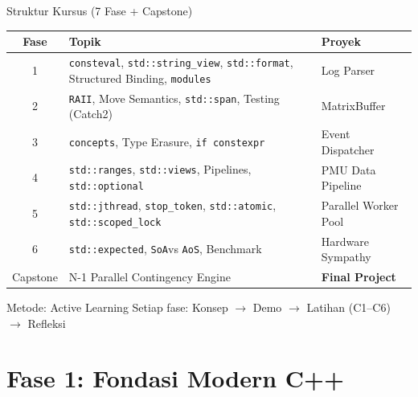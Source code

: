 \documentclass[aspectratio=169,10pt]{beamer}
\newcommand{\consteval}{\texttt{consteval}}
\newcommand{\stringview}{\texttt{std::string\_view}}
\newcommand{\stdspan}{\texttt{std::span}}
\newcommand{\optional}{\texttt{std::optional}}
\newcommand{\expected}{\texttt{std::expected}}
\newcommand{\jthread}{\texttt{std::jthread}}
\newcommand{\atomic}{\texttt{std::atomic}}
\newcommand{\scopedlock}{\texttt{std::scoped\_lock}}
\newcommand{\ranges}{\texttt{std::ranges}}
\newcommand{\views}{\texttt{std::views}}
\newcommand{\format}{\texttt{std::format}}
\newcommand{\concepts}{\texttt{concepts}}
\newcommand{\AoS}{\texttt{AoS}}
\newcommand{\SoA}{\texttt{SoA}}
\newcommand{\RAII}{\texttt{RAII}}
\newcommand{\modules}{\texttt{modules}}
\newcommand{\stoptoken}{\texttt{stop\_token}}
\begin{document}
\begin{frame}{Struktur Kursus (7 Fase + Capstone)}
  \begin{center}
    \begin{tabular}{cll}
      \toprule
      \textbf{Fase} & \textbf{Topik} & \textbf{Proyek} \\
      \midrule
      1 & \consteval, \stringview, \format, Structured Binding, \modules & Log Parser \\
      2 & \RAII, Move Semantics, \stdspan, Testing (Catch2) & MatrixBuffer \\
      3 & \concepts, Type Erasure, \texttt{if constexpr} & Event Dispatcher \\
      4 & \ranges, \views, Pipelines, \optional & PMU Data Pipeline \\
      5 & \jthread, \stoptoken, \atomic, \scopedlock & Parallel Worker Pool \\
      6 & \expected, \SoA vs \AoS, Benchmark & Hardware Sympathy \\
      Capstone & N-1 Parallel Contingency Engine & \textbf{Final Project} \\
      \bottomrule
    \end{tabular}
  \end{center}
  
  \vspace{0.5cm}
  \begin{alertblock}{Metode: Active Learning}
    Setiap fase: Konsep $\rightarrow$ Demo $\rightarrow$ Latihan (C1--C6) $\rightarrow$ Refleksi
  \end{alertblock}
\end{frame}

\section{Fase 1: Fondasi Modern C++}
\end{document}
